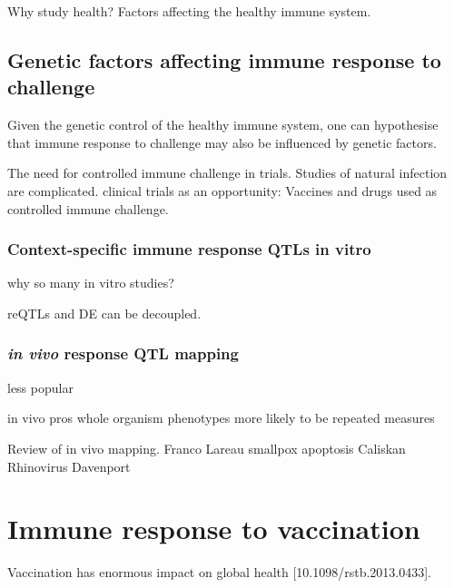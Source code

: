 Why study health?
Factors affecting the healthy immune system.

\subsection{Genetic factors affecting immune response to challenge}

Given the genetic control of the healthy immune system, one can hypothesise that immune response to challenge may also be influenced by genetic factors.

The need for controlled immune challenge in trials.
Studies of natural infection are complicated.
clinical trials as an opportunity: 
    Vaccines and drugs used as controlled immune challenge.

\subsubsection{Context-specific immune response QTLs in vitro}

\begin{outline}

\1 why so many in vitro studies?

\1 reQTLs and DE can be decoupled.

\end{outline}

\subsubsection{\textit{in vivo} response QTL mapping}

less popular

in vivo pros
    whole organism phenotypes
    more likely to be repeated measures

Review of in vivo mapping.
Franco
Lareau smallpox apoptosis
Caliskan Rhinovirus
Davenport

\section{Immune response to vaccination}

Vaccination has enormous impact on global health [10.1098/rstb.2013.0433].

